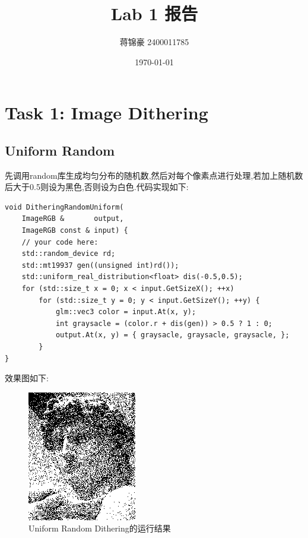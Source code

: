 \documentclass{ctexart}
\title{\textbf{Lab 1 报告}}
\author{蒋锦豪 2400011785}
\date{\today}
\begin{document}
\maketitle
\section*{Task 1: Image Dithering}
\subsection*{Uniform Random}
先调用{\codefont random}库生成均匀分布的随机数,然后对每个像素点进行处理,若加上随机数后大于0.5则设为黑色,否则设为白色.代码实现如下:
\begin{lstlisting}
void DitheringRandomUniform(
    ImageRGB &       output,
    ImageRGB const & input) {
    // your code here:
    std::random_device rd;
    std::mt19937 gen((unsigned int)rd());
    std::uniform_real_distribution<float> dis(-0.5,0.5);
    for (std::size_t x = 0; x < input.GetSizeX(); ++x)
        for (std::size_t y = 0; y < input.GetSizeY(); ++y) {
            glm::vec3 color = input.At(x, y);
            int graysacle = (color.r + dis(gen)) > 0.5 ? 1 : 0;
            output.At(x, y) = { graysacle, graysacle, graysacle, };
        }
}
\end{lstlisting}
效果图如下:
\begin{figure}[H]
    \centering\includegraphics[scale=0.75]{figure/UniformRandom.png}
    \caption{Uniform Random Dithering的运行结果}
\end{figure}
\end{document}
